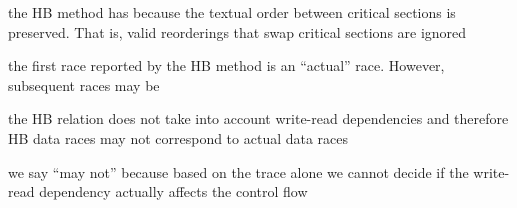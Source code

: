 \documentclass[landscape, a4paper]{article}
\begin{document}
\begin{minipage}[t]{0.19\linewidth}
\begin{betterlist}
		\item {}
		\begin{betterlist}
			\item the HB method has  because the textual order between critical sections is preserved. That is, valid reorderings that swap critical sections are ignored
			\item the first race reported by the HB method is an \enquote{actual} race. However, subsequent races may be 
			\begin{betterlist}
				\item the HB relation does not take into account write-read dependencies and therefore HB data races may not correspond to actual data races
				\item we say \enquote{may not} because based on the trace alone we cannot decide if the write-read dependency actually affects the control flow
			\end{betterlist}
		\end{betterlist}
	\end{betterlist}

\end{minipage}
\end{document}
